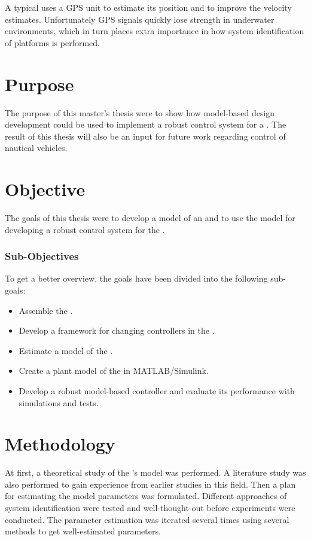 A typical \abbrUV uses a GPS unit to estimate its position and to improve the velocity estimates. Unfortunately GPS signals quickly lose strength in underwater environments, which in turn places extra importance in how system identification of \abbrROV platforms is performed.


\section{Purpose}
The purpose of this master's thesis were to show how model-based design development could be used to implement a robust control system for a \abbrROV. The result of this thesis will also be an input for future work regarding control of nautical vehicles. 


\section{Objective}
The goals of this thesis were to develop a model of an \abbrROV and to use the model for developing a robust control system for the \abbrROV.

\subsubsection{Sub-Objectives}
To get a better overview, the goals have been divided into the following sub-goals:
\begin{itemize}
    \item Assemble the \abbrROV.
    \item Develop a framework for changing controllers in the \abbrROV.
    \item Estimate a model of the \abbrROV.
    \item Create a plant model of the \abbrROV in MATLAB/Simulink.
    \item Develop a robust model-based controller and evaluate its performance with simulations and tests.
\end{itemize}

\section{Methodology}
At first, a theoretical study of the \abbrROV's model was performed. A literature study was also performed to gain experience from earlier studies in this field. Then a plan for estimating the model parameters was formulated. Different approaches of system identification were tested and well-thought-out before experiments were conducted. The parameter estimation was iterated several times using several methods to get well-estimated parameters. 

